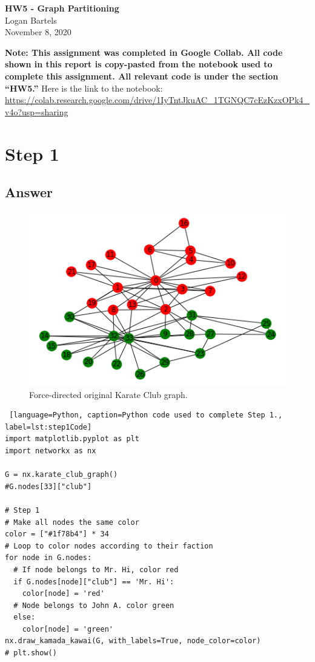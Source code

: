 \documentclass[12pt]{article}
\begin{document}
\begin{centering}
{\large\textbf{HW5 - Graph Partitioning}}\\ %
Logan Bartels\\                     %
November 8, 2020\\                      %
\end{centering}



\textbf{Note: This assignment was completed in Google Collab.  All code shown in this report is copy-pasted from the notebook used to complete this assignment.  All relevant code is under the section ``HW5.''}  Here is the link to the notebook: \url{https://colab.research.google.com/drive/1IyTntJkuAC_1TGNQC7cEzKzxOPk4_v4o?usp=sharing}

\section*{Step 1}

\subsection*{Answer}

\begin{figure}[h]
    \centering
    \includegraphics{step1.png}
    \caption{Force-directed original Karate Club graph.}
    \label{fig:step1Graph}
\end{figure}

\begin{lstlisting} [language=Python, caption=Python code used to complete Step 1., label=lst:step1Code]
import matplotlib.pyplot as plt
import networkx as nx

G = nx.karate_club_graph()
#G.nodes[33]["club"]

# Step 1
# Make all nodes the same color
color = ["#1f78b4"] * 34
# Loop to color nodes according to their faction
for node in G.nodes:  
  # If node belongs to Mr. Hi, color red
  if G.nodes[node]["club"] == 'Mr. Hi':
    color[node] = 'red'
  # Node belongs to John A. color green
  else:
    color[node] = 'green'
nx.draw_kamada_kawai(G, with_labels=True, node_color=color)
# plt.show()

\end{lstlisting}
\end{document}
